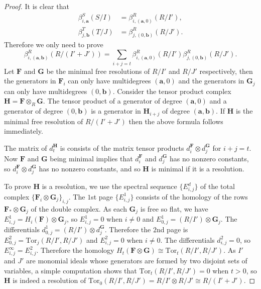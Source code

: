 \documentclass[dvipsnames,10pt]{article}
\begin{document}
\begin{proof}
    It is clear that
    \begin{align*}
        \beta_{i,\mathbf{a}}^S(S/I)&=\beta_{i,(\mathbf{a},0)}^R(R/I'),\\
        \beta_{j,\mathbf{b}}^T(T/J)&=\beta_{j,(0,\mathbf{b})}^R(R/J').
    \end{align*}
    Therefore we only need to prove
    \begin{equation*}
        \beta_{i,(\mathbf{a},\mathbf{b})}^R(R/(I'+J')) = \sum_{i+j=t}\beta_{i,(\mathbf{a},0)}^R(R/I')\beta_{j,(0,\mathbf{b})}^R(R/J').
    \end{equation*}
    Let $\mathbf{F}$ and $\mathbf{G}$ be the minimal free resolutions of $R/I'$ and $R/J'$ respectively, then the generators in $\mathbf{F}_i$ can only have multidegrees $(\mathbf{a},0)$ and the generators in $\mathbf{G}_j$ can only have multidegrees $(0,\mathbf{b})$. Consider the tensor product complex $\mathbf{H}=\mathbf{F}\otimes_R \mathbf{G}$. The tensor product of a generator of degree $(\mathbf{a},0)$ and a generator of degree $(0,\mathbf{b})$ is a generator in $\mathbf{H}_{i+j}$ of degree $(\mathbf{a},\mathbf{b})$. If $\mathbf{H}$ is the minimal free resolution of $R/(I'+J')$ then the above formula follows immediately.

    The matrix of $d_t^\mathbf{H}$ is consists of the matrix tensor products $d_i^\mathbf{F}\otimes d_j^\mathbf{G}$ for $i+j=t$. Now $\mathbf{F}$ and $\mathbf{G}$ being minimal implies that $d_i^\mathbf{F}$ and $d_j^\mathbf{G}$ has no nonzero constants, so $d_i^\mathbf{F}\otimes d_j^\mathbf{G}$ has no nonzero constants, and so $\mathbf{H}$ is minimal if it is a resolution.

    To prove $\mathbf{H}$ is a resolution, we use the spectral sequence $\{E_{i,j}^d\}$ of the total complex $\{\mathbf{F}_i\otimes \mathbf{G}_j\}_{i,j}$. The $1$st page $\{E^1_{i,j}\}$ consists of the homology of the rows $\mathbf{F}_{\ast}\otimes \mathbf{G}_j$ of the double complex. As each $\mathbf{G}_j$ is free so flat, we have $E^1_{i,j}=H_i(\mathbf{F})\otimes \mathbf{G}_j$, so $E^1_{i,j}=0$ when $i\neq 0$ and $E^1_{0,j}=(R/I')\otimes \mathbf{G}_j$. The differentials $d^1_{0,j}=(R/I')\otimes d^\mathbf{G}_j$. Therefore the $2$nd page is $E^2_{0,j}=\mathrm{Tor}_j(R/I',R/J')$ and $E^2_{i,j}=0$ when $i\neq 0$. The differentials $d^2_{i,j}=0$, so $E^\infty_{i,j}=E^2_{i,j}$. Therefore the homology $H_t(\mathbf{F}\otimes \mathbf{G})\cong\mathrm{Tor}_t(R/I',R/J')$. As $I'$ and $J'$ are monomial ideals whose generators are formed by two disjoint sets of variables, a simple computation shows that $\mathrm{Tor}_t(R/I',R/J')=0$ when $t>0$, so $\mathbf{H}$ is indeed a resolution of $\mathrm{Tor}_0(R/I',R/J')=R/I'\otimes R/J'\cong R/(I'+J')$.
\end{proof}
\end{document}
